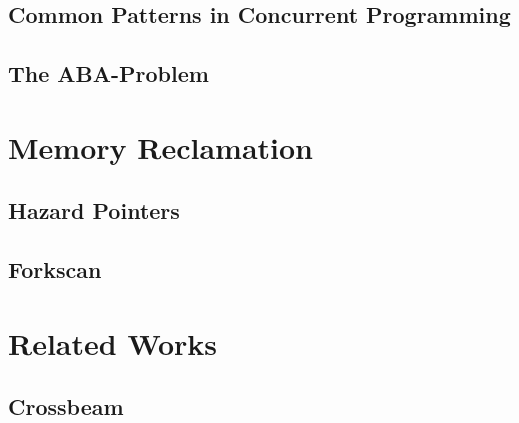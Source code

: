 \subsection{Common Patterns in Concurrent Programming\label{sec:common-patterns}}
\blindtext{}

\subsection{The ABA-Problem\label{sec:aba-problem}}


\section{Memory Reclamation}
\blindtext{}

\subsection{Hazard Pointers\label{sec:hazard-pointers}}
\blindtext{}

\subsection{Forkscan\label{sec:forkscan}}
\blindtext{}


\section{Related Works}
\blindtext{}

\subsection{Crossbeam}
\blindtext{}
